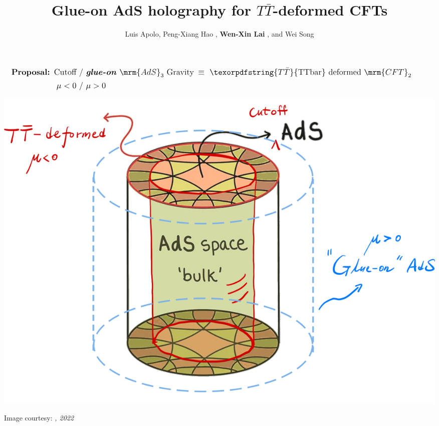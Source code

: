 \documentclass[12pt]{article}
\title{Glue-on AdS holography for $T\bar T$-deformed CFTs}
\author{%
	Luis Apolo,
	Peng-Xiang Hao \textkai{郝鹏翔},
	\textbf{Wen-Xin Lai \textkai{赖文昕}},
	and Wei Song \textkai{宋伟}
}
\date{}
\newcommand{\TTbar}{\texorpdfstring{\ensuremath{T\bar{T}}}{TTbar}\xspace}
\begin{document}
\maketitle
\thispagestyle{empty}

\begin{equation*}
\large
\hspace{-2em}
\begin{aligned}
	\textbf{Proposal:}\ \,
	\textrm{Cutoff}
	\ &/\ %
	\text{\textbf{\textit{glue-on}} $\mrm{AdS}_3$ Gravity}
	\!\!&\equiv\ %
	\textrm{\TTbar deformed $\mrm{CFT}_2$} \\[.5ex]
	\mu < 0
	\ &/\ %
	\mu > 0
	&
\end{aligned}
\end{equation*}

\vspace{-1ex}
\hspace{-1em}
\begin{minipage}{.57\linewidth}
\centering
\includegraphics[width=\linewidth]{img/ads-cft-cutoff.png}

\vspace{-.3\baselineskip}
\scriptsize\hspace{-2.5em}
Image courtesy: \textsl{\citeauthor{AldegundePWSep22}, 2022}
\end{minipage}%
\end{document}
